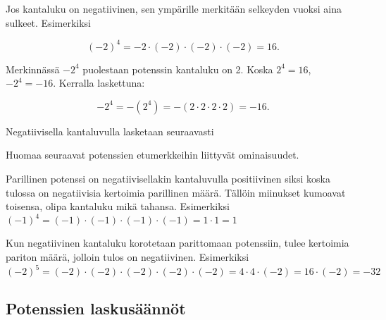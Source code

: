 Jos kantaluku on negatiivinen, sen ympärille merkitään selkeyden vuoksi
aina sulkeet. Esimerkiksi

\[ (-2)^4 = -2 \cdot (-2)\cdot(-2)\cdot(-2) = 16. \]

Merkinnässä $-2^4$ puolestaan potenssin kantaluku on 2. Koska $2^4 = 16$,
$-2^4=-16$. Kerralla laskettuna:     

\[ -2^4 =-(2^4)= -(2 \cdot 2\cdot 2 \cdot 2) = -16. \]          
            
    \begin{esimerkki}
        Negatiivisella kantaluvulla lasketaan seuraavasti
        \begin{alakohdat}
         \end{alakohdat}
    \end{esimerkki}
    
    
Huomaa seuraavat potenssien etumerkkeihin liittyvät ominaisuudet.



Parillinen potenssi on negatiivisellakin kantaluvulla positiivinen siksi koska tulossa on negatiivisia kertoimia parillinen määrä. Tällöin miinukset kumoavat toisensa, olipa kantaluku mikä tahansa. 
Esimerkiksi $(-1)^4=(-1) \cdot (-1) \cdot (-1) \cdot (-1)= 1\cdot 1=1$

Kun negatiivinen kantaluku korotetaan parittomaan potenssiin, tulee kertoimia pariton määrä, jolloin tulos on negatiivinen. 
Esimerkiksi $(-2)^5=(-2) \cdot (-2) \cdot (-2) \cdot (-2) \cdot (-2)=4\cdot4\cdot(-2)=16\cdot(-2)= -32$
    
    
\subsection*{Potenssien laskusäännöt}

